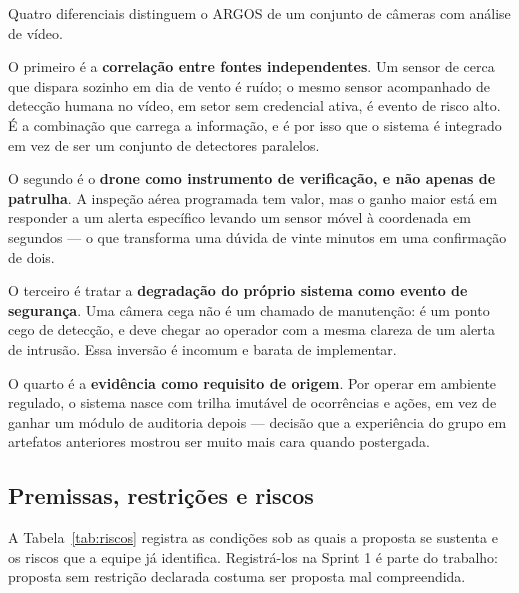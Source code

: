\documentclass[12pt,a4paper,oneside]{article}
\begin{document}
Quatro diferenciais distinguem o ARGOS de um conjunto de câmeras com análise de
vídeo.

O primeiro é a \textbf{correlação entre fontes independentes}. Um sensor de
cerca que dispara sozinho em dia de vento é ruído; o mesmo sensor acompanhado
de detecção humana no vídeo, em setor sem credencial ativa, é evento de risco
alto. É a combinação que carrega a informação, e é por isso que o sistema é
integrado em vez de ser um conjunto de detectores paralelos.

O segundo é o \textbf{drone como instrumento de verificação, e não apenas de
patrulha}. A inspeção aérea programada tem valor, mas o ganho maior está em
responder a um alerta específico levando um sensor móvel à coordenada em
segundos — o que transforma uma dúvida de vinte minutos em uma confirmação de
dois.

O terceiro é tratar a \textbf{degradação do próprio sistema como evento de
segurança}. Uma câmera cega não é um chamado de manutenção: é um ponto cego de
detecção, e deve chegar ao operador com a mesma clareza de um alerta de
intrusão. Essa inversão é incomum e barata de implementar.

O quarto é a \textbf{evidência como requisito de origem}. Por operar em
ambiente regulado, o sistema nasce com trilha imutável de ocorrências e ações,
em vez de ganhar um módulo de auditoria depois — decisão que a experiência do
grupo em artefatos anteriores mostrou ser muito mais cara quando postergada.

\subsection{Premissas, restrições e riscos}

A Tabela~\ref{tab:riscos} registra as condições sob as quais a proposta se
sustenta e os riscos que a equipe já identifica. Registrá-los na Sprint 1 é
parte do trabalho: proposta sem restrição declarada costuma ser proposta mal
compreendida.
\end{document}
